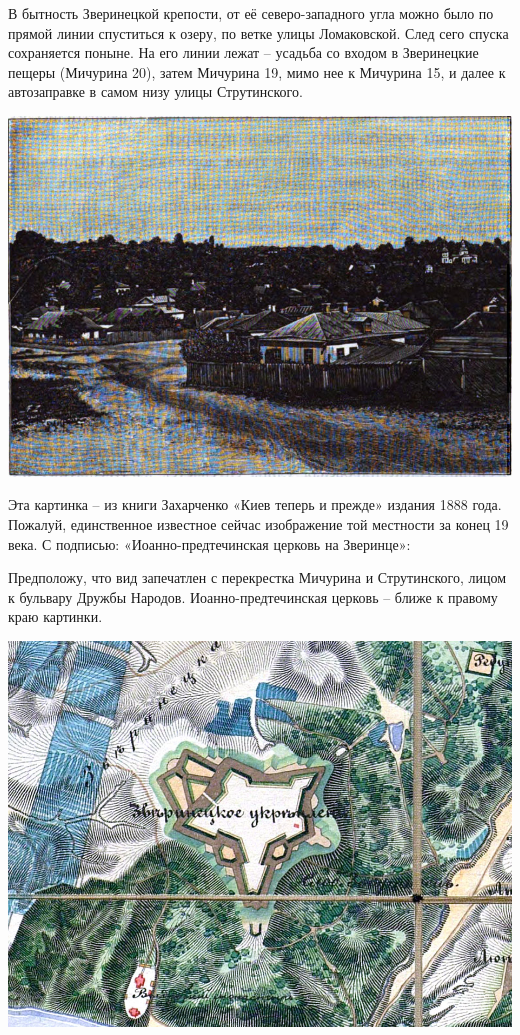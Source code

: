 В бытность Зверинецкой крепости, от её северо-запад\-ного угла можно было по прямой линии спуститься к озеру, по ветке улицы Ломаковской. След сего спуска сохраняется поныне. На его линии лежат – усадьба со входом в Зверинецкие пещеры (Мичурина 20), затем Мичурина 19, мимо нее к Мичурина 15, и далее к автозаправке в самом низу улицы Струтинского.

\newpage

\vspace*{\fill}


\begin{center}
\includegraphics[width=\linewidth]{chast-vosp/zver/1888-zver.jpg}
\end{center}

Эта картинка – из книги Захарченко «Киев теперь и прежде» издания 1888 года. Пожалуй, единственное известное сейчас изображение той местности за конец 19 века. С подписью: «Иоанно-предтечин\-ская церковь на Зверинце»:

Предположу, что вид запечатлен с перекрестка Мичурина и Струтинского, лицом к бульвару Дружбы Народов. Иоанно-предтечинская церковь – ближе к правому краю картинки.

\vspace*{\fill}


\newpage

\begin{center}
\includegraphics[width=0.95\linewidth]{chast-vosp/zver/1833-map.png}
\end{center}

